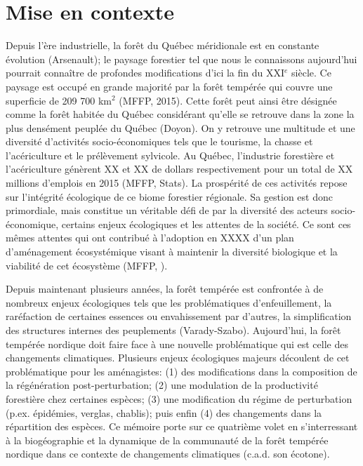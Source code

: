 
\section*{Mise en contexte}

Depuis l'ère industrielle, la forêt du Québec méridionale est en constante évolution (Arsenault); le
paysage forestier tel que nous le connaissons aujourd'hui pourrait connaître de profondes
modifications d'ici la fin du XXI$^e$ siècle. Ce paysage est occupé en grande majorité par la forêt
tempérée qui couvre une superficie de 209 700 km$^2$ (MFFP, 2015). Cette forêt peut ainsi être
désignée comme la forêt habitée du Québec considérant qu'elle se retrouve dans la zone la plus
densément peuplée du Québec (Doyon). On y retrouve une multitude et une diversité d'activités
socio-économiques tels que le tourisme, la chasse et l'acériculture et le prélèvement sylvicole. Au
Québec, l'industrie forestière et l'acériculture génèrent XX et XX de dollars respectivement pour un
total de XX millions d'emplois en 2015 (MFFP, Stats). La prospérité de ces activités repose sur
l'intégrité écologique de ce biome forestier régionale. Sa gestion est donc primordiale, mais
constitue un véritable défi de par la diversité des acteurs socio-économique, certains enjeux
écologiques et les attentes de la société. Ce sont ces mêmes attentes qui ont contribué à l'adoption
en XXXX d'un plan d'aménagement écosystémique visant à maintenir la diversité biologique et la
viabilité de cet écosystème (MFFP, ).

Depuis maintenant plusieurs années, la forêt tempérée est confrontée à de nombreux enjeux
écologiques tels que les problématiques d'enfeuillement, la raréfaction de certaines essences ou
envahissement par d’autres, la simplification des structures internes des peuplements
(Varady-Szabo). Aujourd'hui, la forêt tempérée nordique doit faire face à une nouvelle problématique
qui est celle des changements climatiques. Plusieurs enjeux écologiques majeurs découlent de cet
problématique pour les aménagistes: (1) des modifications dans la composition de la régénération
post-perturbation; (2) une modulation de la productivité forestière chez certaines espèces; (3) une
modification du régime de perturbation (p.ex. épidémies, verglas, chablis); puis enfin (4) des
changements dans la répartition des espèces. Ce mémoire porte sur ce quatrième volet en s'interressant à la biogéographie et la dynamique de la communauté de la forêt tempérée
nordique dans ce contexte de changements climatiques (c.a.d. son écotone).


